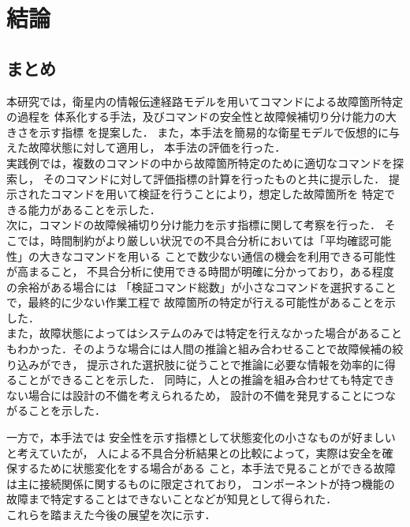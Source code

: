 \documentclass[11pt]{jsreport}
\begin{document}
\fi

\chapter{結論}

\section{まとめ}
本研究では，衛星内の情報伝達経路モデルを用いてコマンドによる故障箇所特定の過程を
体系化する手法，及びコマンドの安全性と故障候補切り分け能力の大きさを示す指標
を提案した．
また，本手法を簡易的な衛星モデルで仮想的に与えた故障状態に対して適用し，
本手法の評価を行った．\\
実践例では，複数のコマンドの中から故障箇所特定のために適切なコマンドを探索し，
そのコマンドに対して評価指標の計算を行ったものと共に提示した．
提示されたコマンドを用いて検証を行うことにより，想定した故障箇所を
特定できる能力があることを示した．\\
次に，コマンドの故障候補切り分け能力を示す指標に関して考察を行った．
そこでは，時間制約がより厳しい状況での不具合分析においては「平均確認可能性」の大きなコマンドを用いる
ことで数少ない通信の機会を利用できる可能性が高まること，
不具合分析に使用できる時間が明確に分かっており，ある程度の余裕がある場合には
「検証コマンド総数」が小さなコマンドを選択することで，最終的に少ない作業工程で
故障箇所の特定が行える可能性があることを示した．\\
また，故障状態によってはシステムのみでは特定を行えなかった場合があること
もわかった．そのような場合には人間の推論と組み合わせることで故障候補の絞り込みができ，
提示された選択肢に従うことで推論に必要な情報を効率的に得ることができることを示した．
同時に，人との推論を組み合わせても特定できない場合には設計の不備を考えられるため，
設計の不備を発見することにつながることを示した．

一方で，本手法では
安全性を示す指標として状態変化の小さなものが好ましいと考えていたが，
人による不具合分析結果との比較によって，実際は安全を確保するために状態変化をする場合がある
こと，本手法で見ることができる故障は主に接続関係に関するものに限定されており，
コンポーネントが持つ機能の故障まで特定することはできないことなどが知見として得られた．\\
これらを踏まえた今後の展望を次に示す．

\newpage
\end{document}

